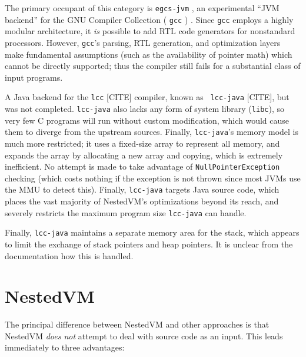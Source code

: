 \documentclass{acmconf}
\begin{document}
The primary occupant of this category is {\tt egcs-jvm}
\cite{egcsjvm}, an experimental ``JVM backend'' for the GNU Compiler
Collection ( {\tt gcc} ) \cite{gcc}.  Since {\tt gcc} employs a highly
modular architecture, it {\it is} possible to add RTL code generators
for nonstandard processors.  However, {\tt gcc}'s parsing, RTL
generation, and optimization layers make fundamental assumptions (such
as the availability of pointer math) which cannot be directly
supported; thus the compiler still fails for a substantial class of
input programs.

A Java backend for the {\tt lcc} [CITE] compiler, known as {\tt
lcc-java} [CITE], but was not completed.  {\tt lcc-java} also lacks
any form of system library ({\tt libc}), so very few C programs will
run without custom modification, which would cause them to diverge
from the upstream sources.  Finally, {\tt lcc-java}'s memory model is
much more restricted; it uses a fixed-size array to represent all
memory, and expands the array by allocating a new array and copying,
which is extremely inefficient.  No attempt is made to take advantage
of {\tt NullPointerException} checking (which costs nothing if the
exception is not thrown since most JVMs use the MMU to detect this).
Finally, {\tt lcc-java} targets Java source code, which places the
vast majority of NestedVM's optimizations beyond its reach, and
severely restricts the maximum program size {\tt lcc-java} can handle.

Finally, {\tt lcc-java} maintains a separate memory area for the
stack, which appears to limit the exchange of stack pointers and heap
pointers.  It is unclear from the documentation how this is handled.


\section{NestedVM}

The principal difference between NestedVM and other approaches is that
NestedVM {\it does not} attempt to deal with source code as an input.
This leads immediately to three advantages:
\end{document}
